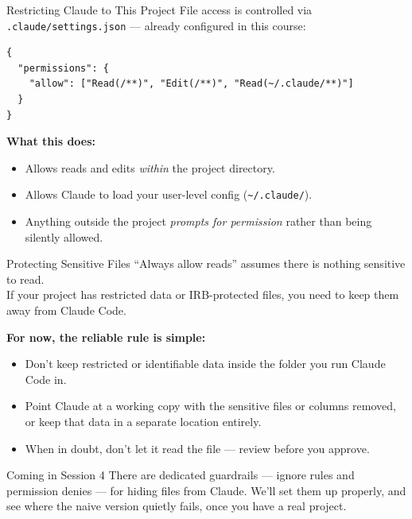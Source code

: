 \documentclass[aspectratio=169, 11pt]{beamer}
\begin{document}
\begin{frame}[fragile]{Restricting Claude to This Project}
  File access is controlled via \texttt{.claude/settings.json} --- already configured in this course:

  \begin{lstlisting}[basicstyle=\ttfamily\footnotesize]
{
  "permissions": {
    "allow": ["Read(/**)", "Edit(/**)", "Read(~/.claude/**)"]
  }
}
  \end{lstlisting}

  \textbf{What this does:}
  \begin{itemize}
    \item Allows reads and edits \textit{within} the project directory.
    \item Allows Claude to load your user-level config (\texttt{\textasciitilde/.claude/}).
    \item Anything outside the project \textit{prompts for permission} rather than being silently allowed.
  \end{itemize}
\end{frame}

\begin{frame}{Protecting Sensitive Files}
  ``Always allow reads'' assumes there is nothing sensitive to read.\\
  If your project has restricted data or IRB-protected files, you need to keep them away from Claude Code.

  \vspace{0.5em}
  \textbf{For now, the reliable rule is simple:}
  \begin{itemize}
    \item Don't keep restricted or identifiable data inside the folder you run Claude Code in.
    \item Point Claude at a working copy with the sensitive files or columns removed, or keep that data in a separate location entirely.
    \item When in doubt, don't let it read the file --- review before you approve.
  \end{itemize}

  \vspace{0.6em}
  \begin{block}{Coming in Session 4}
    There are dedicated guardrails --- ignore rules and permission denies --- for hiding files from Claude. We'll set them up properly, and see where the naive version quietly fails, once you have a real project.
  \end{block}
\end{frame}
\end{document}
